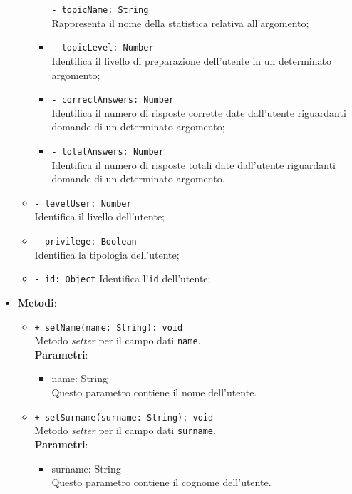 \begin{itemize}
\begin{itemize}
\begin{itemize}
					\texttt{- topicName: String}\\
					Rappresenta il nome della statistica relativa all'argomento;	 
					\item
					\texttt{- topicLevel: Number}\\
					Identifica il livello di preparazione dell'utente in un determinato argomento;
					\item
					\texttt{- correctAnswers: Number}\\
					Identifica il numero di risposte corrette date dall'utente riguardanti domande di un determinato argomento; 
					\item						
					\texttt{- totalAnswers: Number}\\
					Identifica il numero di risposte totali date dall'utente riguardanti domande di un determinato argomento.		
				\end{itemize}		
				\item 
				\texttt{- levelUser: Number}\\
				Identifica il livello dell'utente;			
				\item 
				\texttt{- privilege: Boolean}\\
				Identifica la tipologia dell'utente;	
				\item
				\texttt{- id: Object}
				Identifica l'\texttt{id} dell'utente;
			\end{itemize}
			\item \textbf{Metodi}: 
			\begin{itemize}
				\item \texttt{+ setName(name: String): void} \\
				Metodo \textit{setter} per il campo dati \texttt{name}.\\
				\textbf{Parametri}:
				\begin{itemize}
					\item {name: String}\\
					Questo parametro contiene il nome dell'utente.
				\end{itemize}
				
				\item \texttt{+ setSurname(surname: String): void} \\
				Metodo \textit{setter} per il campo dati \texttt{surname}.\\
				\textbf{Parametri}:
				\begin{itemize}
					\item {surname: String}\\
					Questo parametro contiene il cognome dell'utente.
				\end{itemize}
				

\end{itemize}
\end{itemize}
